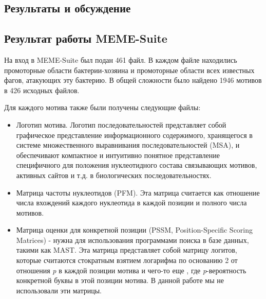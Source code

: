 \documentclass[14pt]{extarticle}
\begin{document}
\newpage
\begin{center}
    \item \section{Результаты и обсуждение}
    \item \subsection{Результат работы MEME-Suite}
\end{center}

    
    \par{На вход в MEME-Suite был подан 461 файл. В каждом файле находились промоторные области бактерии-хозяина и 
    промоторные области всех известных \cite{virus-host} фагов, атакующих эту бактерию. В общей сложности было найдено 
    1946 мотивов в 426 исходных файлов.}
    
    \par{Для каждого мотива также были получены следующие файлы: }
    
    \begin{itemize}
    \item Логотип мотива. Логотип последовательностей представляет собой графическое представление информационного
    содержимого, хранящегося в системе множественного выравнивания последовательностей (MSA), и обеспечивают
    компактное и интуитивно понятное представление специфичного для положения нуклеотидного состава связывающих
    мотивов, активных сайтов и т.д. в биологических последовательностях.
   
    \item Матрица частоты нуклеотидов (PFM). Эта матрица считается как отношение числа вхождений каждого нуклеотида в 
    каждой позиции и полного числа мотивов. 
    
    \item Матрица оценки для конкретной позиции (PSSM, Position-Specific Scoring Matrices) - нужна для использования 
    программами поиска в базе данных, такими как MAST. Эта матрица представляет собой матрицу логитов, которые считаются
    стократным взятием логарифма по основанию 2 от отношения \textit{p} в каждой позиции мотива и чего-то еще 
    \cite{memeres}, где \textit{p}-вероятность конкретной буквы в этой позиции мотива. В данной работе мы не 
    использовали эти матрицы.  
    \end{itemize}
    
\end{document}
